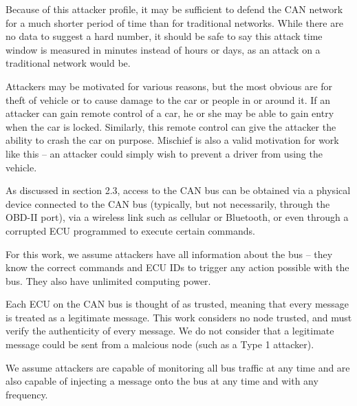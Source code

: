 Because of this attacker profile, it may be sufficient to defend the CAN network for a much shorter period of time than for traditional networks. While there are no data to suggest a hard number, it should be safe to say this attack time window is measured in minutes instead of hours or days, as an attack on a traditional network would be. 


Attackers may be motivated for various reasons, but the most obvious are for theft of vehicle or to cause damage to the car or people in or around it. If an attacker can gain remote control of a car, he or she may be able to gain entry when the car is locked. Similarly, this remote control can give the attacker the ability to crash the car on purpose. Mischief is also a valid motivation for work like this -- an attacker could simply wish to prevent a driver from using the vehicle.

As discussed in section 2.3, access to the CAN bus can be obtained via a physical device connected to the CAN bus (typically, but not necessarily, through the OBD-II port), via a wireless link such as cellular or Bluetooth, or even through a corrupted ECU programmed to execute certain commands.

For this work, we assume attackers have all information about the bus -- they know the correct commands and ECU IDs to trigger any action possible with the bus. They also have unlimited computing power.

Each ECU on the CAN bus is thought of as trusted, meaning that every message is treated as a legitimate message. This work considers no node trusted, and must verify the authenticity of every message. We do not consider that a legitimate message could be sent from a malcious node (such as a Type 1 attacker).

We assume attackers are capable of monitoring all bus traffic at any time and are also capable of injecting a message onto the bus at any time and with any frequency.